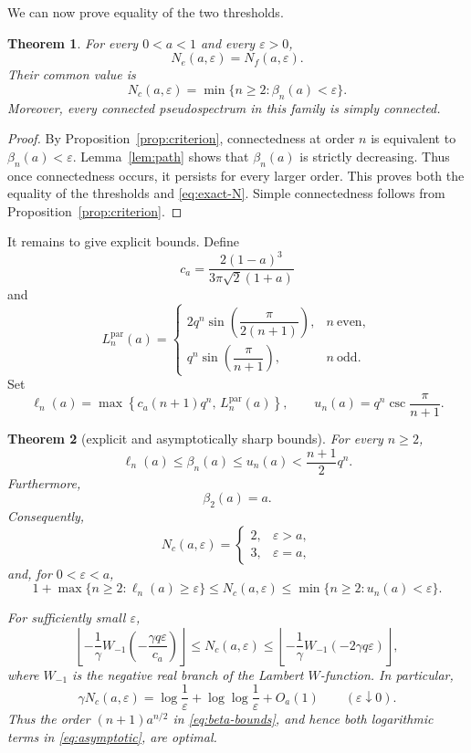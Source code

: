 \documentclass[11pt]{article}
\newtheorem{theorem}{Theorem}
\begin{document}
We can now prove equality of the two thresholds.

\begin{theorem}\label{thm:threshold}
For every \(0<a<1\) and every \(\varepsilon>0\),
\[
N_e(a,\varepsilon)=N_f(a,\varepsilon).
\]
Their common value is
\[
N_c(a,\varepsilon)
=
\min\{n\geq2:\beta_n(a)<\varepsilon\}.
\tag{18}\label{eq:exact-N}
\]
Moreover, every connected pseudospectrum in this family is simply connected.
\end{theorem}

\begin{proof}
By Proposition~\ref{prop:criterion}, connectedness at order \(n\) is equivalent
to \(\beta_n(a)<\varepsilon\).  Lemma~\ref{lem:path} shows that
\(\beta_n(a)\) is strictly decreasing.  Thus once connectedness occurs, it
persists for every larger order.  This proves both the equality of the
thresholds and \eqref{eq:exact-N}.  Simple connectedness follows from
Proposition~\ref{prop:criterion}.
\end{proof}

It remains to give explicit bounds.  Define
\[
c_a=\frac{2(1-a)^3}{3\pi\sqrt2(1+a)}
\]
and
\[
L_n^{\mathrm{par}}(a)=
\begin{cases}
2q^n\sin\!\left(\dfrac{\pi}{2(n+1)}\right),
& n\ \text{even},\\[6pt]
q^n\sin\!\left(\dfrac{\pi}{n+1}\right),
& n\ \text{odd}.
\end{cases}
\]
Set
\[
\ell_n(a)
=
\max\left\{
c_a(n+1)q^n,\,
L_n^{\mathrm{par}}(a)
\right\},
\qquad
u_n(a)
=
q^n\csc\frac{\pi}{n+1}.
\]

\begin{theorem}[explicit and asymptotically sharp bounds]\label{thm:bounds}
For every \(n\geq2\),
\[
\ell_n(a)\leq\beta_n(a)\leq u_n(a)
<\frac{n+1}{2}q^n.
\tag{19}\label{eq:beta-bounds}
\]
Furthermore,
\[
\beta_2(a)=a.
\]
Consequently,
\[
N_c(a,\varepsilon)=
\begin{cases}
2,&\varepsilon>a,\\
3,&\varepsilon=a,
\end{cases}
\tag{20}\label{eq:large-eps}
\]
and, for \(0<\varepsilon<a\),
\[
1+\max\{n\geq2:\ell_n(a)\geq\varepsilon\}
\leq
N_c(a,\varepsilon)
\leq
\min\{n\geq2:u_n(a)<\varepsilon\}.
\tag{21}\label{eq:N-bounds}
\]

For sufficiently small \(\varepsilon\),
\[
\left\lfloor
-\frac1\gamma
W_{-1}\!\left(-\frac{\gamma q\varepsilon}{c_a}\right)
\right\rfloor
\leq
N_c(a,\varepsilon)
\leq
\left\lfloor
-\frac1\gamma
W_{-1}(-2\gamma q\varepsilon)
\right\rfloor,
\tag{22}\label{eq:Lambert}
\]
where \(W_{-1}\) is the negative real branch of the Lambert \(W\)-function.
In particular,
\[
\gamma N_c(a,\varepsilon)
=
\log\frac1\varepsilon
+
\log\log\frac1\varepsilon
+
O_a(1)
\qquad(\varepsilon\downarrow0).
\tag{23}\label{eq:asymptotic}
\]
Thus the order \((n+1)a^{n/2}\) in \eqref{eq:beta-bounds}, and hence both
logarithmic terms in \eqref{eq:asymptotic}, are optimal.
\end{theorem}
\end{document}
